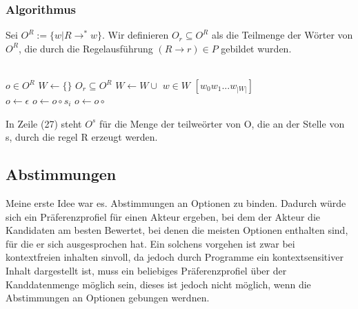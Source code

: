 \documentclass[]{article}
\begin{document}
\newpage
\subsubsection*{Algorithmus}

Sei $O^R:=\{w| R \rightarrow^* w \}$. Wir definieren $O_r \subseteq O^R$ als die Teilmenge der Wörter von $O^R$, die durch die Regelausführung $(R\rightarrow r)\in P$ gebildet wurden.  \\


\begin{algorithm}
  
\caption{$\phi: KAND_G \rightarrow L(S(G))$}\label{euclid}
\begin{algorithmic}[1]
\State\Return {}
\EndFunction
\\

    \Return $o\in O^R$
\Else
  \State $W \gets \{\}$
    \State $O_{r} \subseteq O^R$
    \State $W\gets W\cup$ 
  \EndFor
  \State\Return $w\in W$
  \Else
  \State\Return $[w_0 w_1 ... w_{|W|}]$
  \EndIf
\EndIf
\EndFunction  
\\

  \State $o\gets \epsilon$
      \State$o \gets o \circ s_i$
    \Else
      \State$o \gets o \circ $ 
    \EndIf
  \EndFor
\EndFunction

\end{algorithmic}
\end{algorithm}

In Zeile (27) steht $O^s$ für die Menge der teilweörter von O, die an der Stelle von s, durch die regel R erzeugt werden.




\subsection{Abstimmungen}
Meine erste Idee war es. Abstimmungen an Optionen zu binden. Dadurch würde sich ein Präferenzprofiel für einen Akteur ergeben, bei dem der Akteur die Kandidaten am besten Bewertet, bei denen die meisten Optionen enthalten sind, für die er sich ausgesprochen hat. Ein solchens vorgehen ist zwar bei kontextfreien inhalten sinvoll, da jedoch durch Programme ein kontextsensitiver Inhalt dargestellt ist, muss ein beliebiges Präferenzprofiel über der Kanddatenmenge möglich sein, dieses ist jedoch nicht möglich, wenn die Abstimmungen an Optionen gebungen werdnen.
\end{document}
